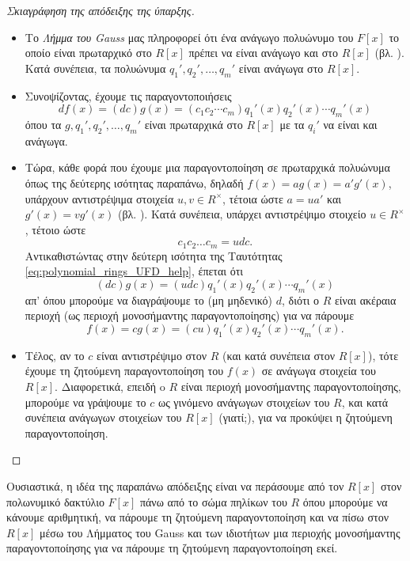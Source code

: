 \documentclass[12pt,a4paper,reqno]{amsart}
\theoremstyle{definition}
\theoremstyle{remark}
\numberwithin{theorem}{section}
\numberwithin{exercise}{section}
\numberwithin{equation}{section}
\begin{document}
\begin{proof}[Σκιαγράφηση της απόδειξης της ύπαρξης]
\begin{itemize}
    \item  Το \emph{Λήμμα του Gauss} μας πληροφορεί ότι ένα ανάγωγο πολυώνυμο του $F[x]$ το οποίο είναι πρωταρχικό στο $R[x]$ πρέπει να είναι ανάγωγο και στο $R[x]$ (βλ. \cite[Πόρισμα 3.4.5.(2)]{VDEMT13}). Κατά συνέπεια, τα πολυώνυμα $q_1', q_2', \dots, q_m'$ είναι ανάγωγα στο $R[x]$.
    
    \item  Συνοψίζοντας, έχουμε τις παραγοντοποιήσεις
    \begin{equation}
        \label{eq:polynomial_rings_UFD_help}
        df(x) = (dc)g(x) = (c_1c_2\cdots c_m)q_1'(x)q_2'(x) \cdots q_m'(x)
    \end{equation}
    όπου τα $g, q_1', q_2', \dots, q_m'$ είναι πρωταρχικά στο $R[x]$ με τα $q_i'$ να είναι και ανάγωγα. 

    \item Τώρα, κάθε φορά που έχουμε μια παραγοντοποίηση σε πρωταρχικά πολυώνυμα όπως της δεύτερης ισότητας παραπάνω, δηλαδή $f(x) = ag(x) = a'g'(x)$, υπάρχουν αντιστρέψιμα στοιχεία $u, v \in R^\times$, τέτοια ώστε $a = ua'$ και $g'(x) = v g'(x)$ (βλ. \cite[Λήμμα 3.4.2]{VDEMT13}). Κατά συνέπεια, υπάρχει αντιστρέψιμο στοιχείο $u \in R^\times$, τέτοιο ώστε
    \[
    c_1c_2 \dots c_m = udc.
    \]
    Αντικαθιστώντας στην δεύτερη ισότητα της Ταυτότητας \eqref{eq:polynomial_rings_UFD_help}, έπεται ότι
    \[
    (dc)g(x) = (udc)q_1'(x)q_2'(x) \cdots q_m'(x) 
    \]
    απ' όπου μπορούμε να διαγράψουμε το (μη μηδενικό) $d$, διότι ο $R$ είναι ακέραια περιοχή (ως περιοχή μονοσήμαντης παραγοντοποίησης) για να πάρουμε 
    \[
    f(x) = cg(x) = (cu)q_1'(x)q_2'(x) \cdots q_m'(x).
    \]

    \item Τέλος, αν το $c$ είναι αντιστρέψιμο στον $R$ (και κατά συνέπεια στον $R[x]$), τότε έχουμε τη ζητούμενη παραγοντοποίηση του $f(x)$ σε ανάγωγα στοιχεία του $R[x]$. Διαφορετικά, επειδή o $R$ είναι περιοχή μονοσήμαντης παραγοντοποίησης, μπορούμε να γράψουμε το $c$ ως γινόμενο ανάγωγων στοιχείων του $R$, και κατά συνέπεια ανάγωγων στοιχείων του $R[x]$ (γιατί;), για να προκύψει η ζητούμενη παραγοντοποίηση.
\end{itemize}
\end{proof}

Ουσιαστικά, η ιδέα της παραπάνω απόδειξης είναι να περάσουμε από τον $R[x]$ στον πολ\-ωνυμικό δακτύλιο $F[x]$ πάνω από το σώμα πηλίκων του $R$ όπου μπορούμε  να κάνουμε αριθμητική, να πάρουμε τη ζητούμενη παραγοντοποίηση και να  πίσω στον $R[x]$ μέσω του Λήμματος του Gauss και των ιδιοτήτων μια περιοχής μονοσήμαντης παραγοντοποίησης για να πάρουμε τη ζητούμενη παραγοντοποίηση εκεί.
\end{document}
